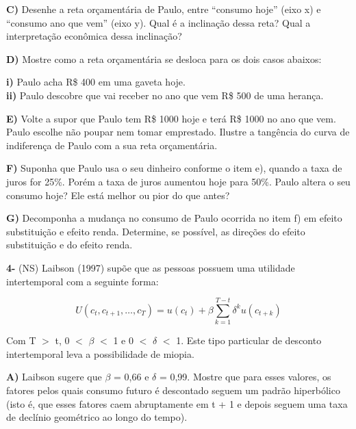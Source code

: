 \begin{flushleft}
\singlespacing

\textbf{C)} Desenhe a reta orçamentária de Paulo, entre “consumo hoje” (eixo x) e “consumo ano que vem” (eixo y). Qual é a inclinação dessa reta? Qual a interpretação econômica dessa inclinação?

\singlespacing

\textbf{D)} Mostre como a reta orçamentária se desloca para os dois casos abaixos:

\singlespacing

\textbf{i)} Paulo acha R\$ 400 em uma gaveta hoje.
\\
\textbf{ii)} Paulo descobre que vai receber no ano que vem R\$ 500 de uma herança.

\singlespacing

\textbf{E)} Volte a supor que Paulo tem R\$ 1000 hoje e terá R\$ 1000 no ano que vem. Paulo escolhe não poupar nem tomar emprestado. Ilustre a tangência do curva de indiferença de Paulo com a sua reta orçamentária. 

\singlespacing

\textbf{F)} Suponha que Paulo usa o seu dinheiro conforme o item e), quando a taxa de juros for 25\%. Porém a taxa de juros aumentou hoje para 50\%. Paulo altera o seu consumo hoje? Ele está melhor ou pior do que antes?

\singlespacing

\textbf{G)} Decomponha a mudança no consumo de Paulo ocorrida no item f) em efeito substituição e efeito renda. Determine, se possível, as direções do efeito substituição e do efeito renda.

\singlespacing

\textbf{4-} (NS) Laibson (1997) supõe que as pessoas possuem uma utilidade intertemporal com a seguinte forma:

\begin{equation}
U\left(c_{t}, c_{t+1}, \ldots, c_{T}\right)=u\left(c_{t}\right)+\beta \sum_{k=1}^{T-t} \delta^{k} u\left(c_{t+k}\right)
\end{equation}

Com T $>$ t, 0 $<$ $\beta$ $<$ 1 e 0 $<$ $\delta$ $<$ 1. Este tipo particular de desconto intertemporal leva a
possibilidade de miopia.

\singlespacing

\textbf{A)} Laibson sugere que $\beta$ = 0,66 e $\delta$ = 0,99. Mostre que para esses valores, os fatores pelos
quais consumo futuro é descontado seguem um padrão hiperbólico (isto é, que esses
fatores caem abruptamente em t + 1 e depois seguem uma taxa de declínio geométrico
ao longo do tempo).


\end{flushleft}
